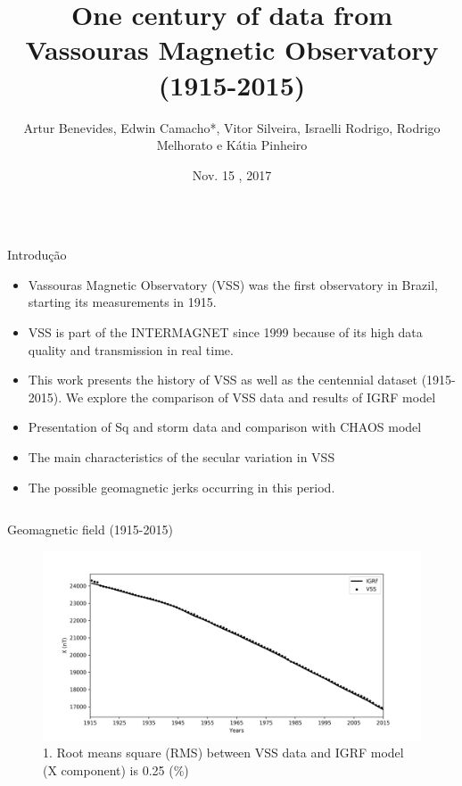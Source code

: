 \documentclass[final,t]{beamer}
\title{\huge One century of data from Vassouras Magnetic Observatory (1915-2015)}
\author[Benevides, Bassrei]{Artur Benevides, Edwin Camacho*, Vitor Silveira, Israelli Rodrigo, Rodrigo Melhorato e Kátia Pinheiro}
\institute[ON-MCTIC]{Observatório Nacional}
\date[Nov , 2017]{Nov. 15 , 2017}
\begin{document}
  \begin{columns}[t]
    \begin{column}{.66\linewidth}

\begin{block}{Introdução}
	
\begin{itemize}
\justifying
		\item Vassouras Magnetic Observatory (VSS) was the first observatory in Brazil, starting its	measurements in 1915. 
		
		\item VSS is part of the INTERMAGNET since 1999 because of its high data quality and transmission in real time.
		
		\item This work presents the history of VSS as well as the centennial dataset (1915-2015). We	explore the comparison of VSS data and results of IGRF model
		
		\item  Presentation of Sq and storm data and comparison with CHAOS model
		
		\item The main characteristics of the secular variation in
		VSS
		
		\item The possible geomagnetic jerks occurring in this period.	
		
	\end{itemize}
	
\end{block}

\begin{columns}
	\begin{column}{.31\linewidth}
	
\begin{block}{Geomagnetic field (1915-2015)}

\begin{figure}
	\centering
	\includegraphics[width=1.0\linewidth]{X}
	\caption{1. Root means square (RMS) between VSS data and IGRF model (X component) is 0.25 (\%)}
	\label{X}
\end{figure}


\end{block}
\end{column}
\end{columns}
\end{column}
\end{columns}
\end{document}
